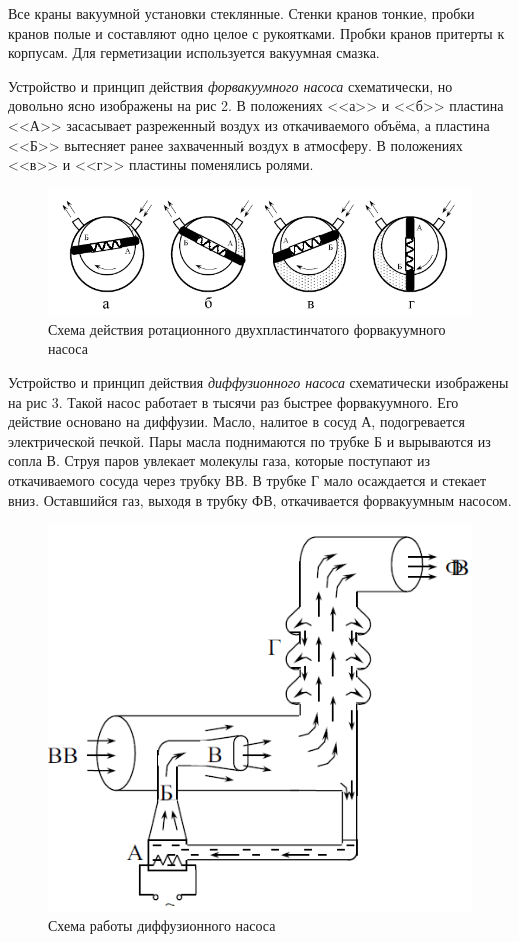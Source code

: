 \documentclass[12pt,a4paper]{article}
\begin{document}
Все краны вакуумной установки стеклянные. Стенки кранов тонкие, пробки кранов \mbox{полые} и составляют одно целое с рукоятками. Пробки кранов притерты к корпусам. Для герметизации используется вакуумная смазка.

\newpage

Устройство и принцип действия \textit{форвакуумного насоса} схематически, но довольно ясно изображены на рис 2. В положениях <<а>> и <<б>> пластина <<А>> засасывает разреженный воздух из откачиваемого объёма, а пластина <<Б>> вытесняет ранее захваченный воздух в атмосферу. В положениях <<в>> и <<г>> пластины поменялись ролями.
\begin{figure}[!h]
    \centering
    \includegraphics[width=0.85\linewidth]{"picks/устройство фв насоса"}
    \caption[]{Схема действия ротационного двухпластинчатого форвакуумного насоса}
    \label{fig:Схема ФВ насоса}
\end{figure}

Устройство и принцип действия \textit{диффузионного насоса} схематически изображены на рис 3. Такой насос работает в тысячи раз быстрее форвакуумного. Его действие основано на диффузии. Масло, налитое в сосуд А, подогревается электрической печкой. Пары масла поднимаются по трубке Б и вырываются из сопла В. Струя паров увлекает молекулы газа, которые поступают из откачиваемого сосуда через трубку ВВ. В трубке Г мало осаждается и стекает вниз. Оставшийся газ, выходя в трубку ФВ, откачивается форвакуумным насосом. \\
\begin{figure}[!h]
    \centering
    \includegraphics[width=0.4\linewidth]{"picks/устройство вв насоса"}
    \caption[]{Схема работы диффузионного насоса}
    \label{fig:Схема ВВ насоса}
\end{figure}
\end{document}

